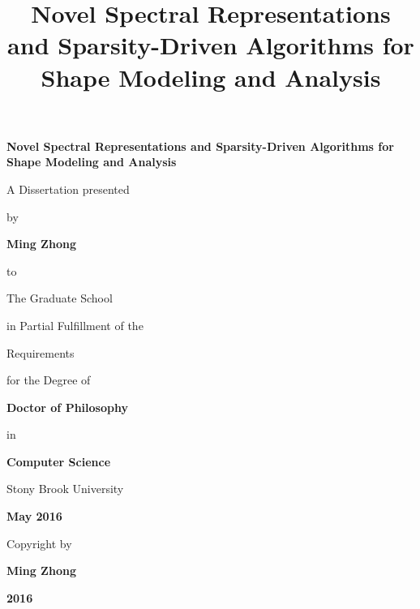 \documentclass[12pt,letterpaper,twosided]{report}
\numberwithin{equation}{section}
\begin{document}
\title{\bf{Novel Spectral Representations and
Sparsity-Driven Algorithms for Shape Modeling and Analysis}}

\vspace*{3\baselineskip}
\begin{center}
{\bf\Large Novel Spectral Representations and
Sparsity-Driven Algorithms for Shape Modeling and Analysis}
\end{center}
\vspace*{3\baselineskip}
\centerline{A Dissertation presented}
\vspace*{1\baselineskip}
\centerline{by}
\vspace*{1\baselineskip}
\centerline{\bf{Ming Zhong}}
\vspace*{1\baselineskip}
\centerline{to}
\vspace*{1\baselineskip}
\centerline{The Graduate School}
\vspace*{1\baselineskip}
\centerline{in Partial Fulfillment of the}
\vspace*{1\baselineskip}
\centerline{Requirements}
\vspace*{1\baselineskip}
\centerline{for the Degree of}
\vspace*{1\baselineskip}
\centerline{\bf{Doctor of Philosophy}}
\vspace*{1\baselineskip}
\centerline{in}
\vspace*{1\baselineskip}
\centerline{\bf{Computer Science}}
\vspace*{2\baselineskip}
\centerline{Stony Brook University}
\vspace*{2\baselineskip}
\centerline{\bf{May 2016}}

\newpage
{}

\vspace*{32\baselineskip}
\centerline{Copyright by}
\centerline{\bf{Ming Zhong}}
\centerline{\bf{2016}}

\newpage
{}
\setcounter{page}{2}
\end{document}
